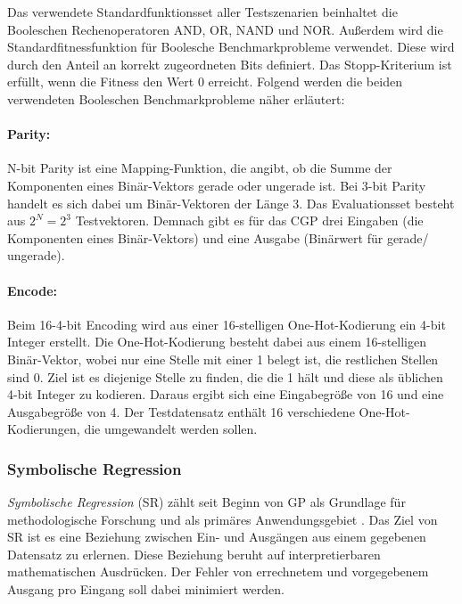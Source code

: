 Das verwendete Standardfunktionsset aller Testszenarien beinhaltet die Booleschen Rechenoperatoren AND, OR, NAND und NOR.
Außerdem wird die Standardfitnessfunktion für Boolesche Benchmarkprobleme verwendet.
Diese wird durch den Anteil an korrekt zugeordneten Bits definiert. \cite{cui_equidistant_2023}
Das Stopp-Kriterium ist erfüllt, wenn die Fitness den Wert 0 erreicht.
Folgend werden die beiden verwendeten Booleschen Benchmarkprobleme näher erläutert:
\paragraph{Parity:} N-bit Parity ist eine Mapping-Funktion, die angibt, ob die Summe der Komponenten eines Binär-Vektors gerade oder ungerade ist.
Bei 3-bit Parity handelt es sich dabei um Binär-Vektoren der Länge 3.
Das Evaluationsset besteht aus $2^N=2^3$ Testvektoren. \cite{hohil_1999}
Demnach gibt es für das CGP drei Eingaben (die Komponenten eines Binär-Vektors) und eine Ausgabe (Binärwert für \glqq gerade\grqq\space / \glqq ungerade\grqq).
\paragraph{Encode:} Beim 16-4-bit Encoding wird aus einer 16-stelligen One-Hot-Kodierung ein 4-bit Integer erstellt.
Die One-Hot-Kodierung besteht dabei aus einem 16-stelligen Binär-Vektor, wobei nur eine Stelle mit einer 1 belegt ist, die restlichen Stellen sind 0.
Ziel ist es diejenige Stelle zu finden, die die 1 hält und diese als üblichen 4-bit Integer zu kodieren. \cite{cui_weighted_mutation, goldman_2015}
Daraus ergibt sich eine Eingabegröße von 16 und eine Ausgabegröße von 4.
Der Testdatensatz enthält 16 verschiedene One-Hot-Kodierungen, die umgewandelt werden sollen.


\subsubsection{Symbolische Regression}
\label{subsubsec:symbolicRegression}

\emph{Symbolische Regression} (SR) zählt seit Beginn von GP als Grundlage für methodologische Forschung und als primäres Anwendungsgebiet \cite{orzechowski}.
Das Ziel von SR ist es eine Beziehung zwischen Ein- und Ausgängen aus einem gegebenen Datensatz zu erlernen.
Diese Beziehung beruht auf interpretierbaren mathematischen Ausdrücken.
Der Fehler von errechnetem und vorgegebenem Ausgang pro Eingang soll dabei minimiert werden. \cite{makke_interpretable_2024}


